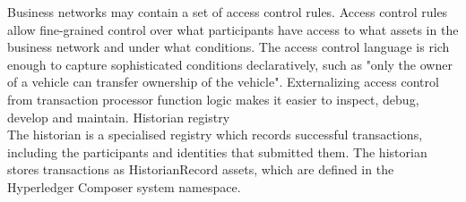 Business networks may contain a set of access control rules. Access control rules allow fine-grained control over what participants have access to what assets in the business network and under what conditions. The access control language is rich enough to capture sophisticated conditions declaratively, such as "only the owner of a vehicle can transfer ownership of the vehicle". Externalizing access control from transaction processor function logic makes it easier to inspect, debug, develop and maintain.
\medskip
Historian registry\\
The historian is a specialised registry which records successful transactions, including the participants and identities that submitted them. The historian stores transactions as HistorianRecord assets, which are defined in the Hyperledger Composer system namespace.
